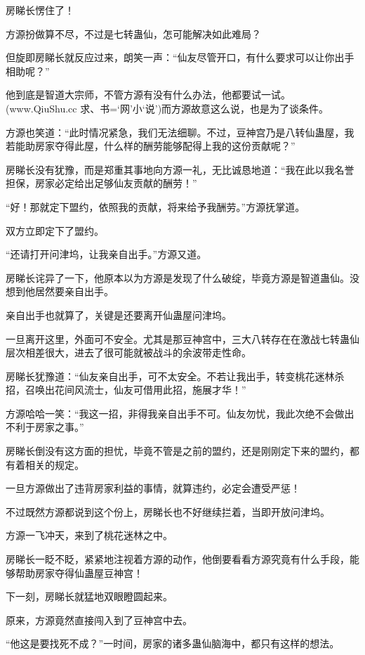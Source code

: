 
\begin{this_body}

房睇长愣住了！

方源扮做算不尽，不过是七转蛊仙，怎可能解决如此难局？

但旋即房睇长就反应过来，朗笑一声：“仙友尽管开口，有什么要求可以让你出手相助呢？”

他到底是智道大宗师，不管方源有没有什么办法，他都要试一试。(www.QiuShu.cc 求、书=‘网’小‘说’)而方源故意这么说，也是为了谈条件。

方源也笑道：“此时情况紧急，我们无法细聊。不过，豆神宫乃是八转仙蛊屋，我若能助房家夺得此屋，什么样的酬劳能够配得上我的这份贡献呢？”

房睇长没有犹豫，而是郑重其事地向方源一礼，无比诚恳地道：“我在此以我名誉担保，房家必定给出足够仙友贡献的酬劳！”

“好！那就定下盟约，依照我的贡献，将来给予我酬劳。”方源抚掌道。

双方立即定下了盟约。

“还请打开问津坞，让我亲自出手。”方源又道。

房睇长诧异了一下，他原本以为方源是发现了什么破绽，毕竟方源是智道蛊仙。没想到他居然要亲自出手。

亲自出手也就算了，关键是还要离开仙蛊屋问津坞。

一旦离开这里，外面可不安全。尤其是那豆神宫中，三大八转存在在激战七转蛊仙层次相差很大，进去了很可能就被战斗的余波带走性命。

房睇长犹豫道：“仙友亲自出手，可不太安全。不若让我出手，转变桃花迷林杀招，召唤出花间风流士，仙友可借用此招，施展才华！”

方源哈哈一笑：“我这一招，非得我亲自出手不可。仙友勿忧，我此次绝不会做出不利于房家之事。”

房睇长倒没有这方面的担忧，毕竟不管是之前的盟约，还是刚刚定下来的盟约，都有着相关的规定。

一旦方源做出了违背房家利益的事情，就算违约，必定会遭受严惩！

不过既然方源都说到这个份上，房睇长也不好继续拦着，当即开放问津坞。

方源一飞冲天，来到了桃花迷林之中。

房睇长一眨不眨，紧紧地注视着方源的动作，他倒要看看方源究竟有什么手段，能够帮助房家夺得仙蛊屋豆神宫！

下一刻，房睇长就猛地双眼瞪圆起来。

原来，方源竟然直接闯入到了豆神宫中去。

“他这是要找死不成？”一时间，房家的诸多蛊仙脑海中，都只有这样的想法。


\end{this_body}
